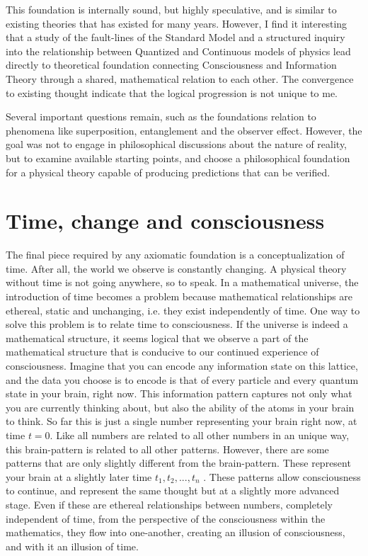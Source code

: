 \documentclass[notitlepage]{report}
\begin{document}
This foundation is internally sound, but highly speculative, and is similar to existing theories that has existed for many years. However, I find it interesting that a study of the fault-lines of the Standard Model and a structured inquiry into the relationship between Quantized and Continuous models of physics lead directly to theoretical foundation connecting Consciousness and Information Theory through a shared, mathematical relation to each other. The convergence to existing thought indicate that the logical progression is not unique to me. 

Several important questions remain, such as the foundations relation to phenomena like superposition, entanglement and the observer effect.
However, the goal was not to engage in philosophical discussions about the nature of reality, but to examine available starting points, and choose a philosophical foundation for a physical theory capable of producing predictions that can be verified. 


\section*{Time, change and consciousness}
The final piece required by any axiomatic foundation is a conceptualization of time. After all, the world we observe is constantly changing. A physical theory without time is not going anywhere, so to speak. In a mathematical universe, the introduction of time becomes a problem because mathematical relationships are ethereal, static and unchanging, i.e. they exist independently of time. 
One way to solve this problem is to relate time to consciousness. If the universe is indeed a mathematical structure, it seems logical that we observe a part of the mathematical structure that is conducive to our continued experience of consciousness. Imagine that you can encode any information state on this lattice, and the data you choose is to encode is that of every particle and every quantum state in your brain, right now. This information pattern captures not only what you are currently thinking about, but also the ability of the atoms in your brain to think.  So far this is just a single number representing your brain right now, at  time $ t =0$. 
Like all numbers are related to all other numbers in an unique way, this brain-pattern is related to all other patterns. However, there are some patterns that are only slightly different from the brain-pattern. These represent your brain at a slightly later time $ t_1, t_2, ...,  t_n $ . These patterns allow consciousness to continue, and represent the same thought but at a slightly more advanced stage.
Even if these are ethereal relationships between numbers, completely independent of time, from the perspective of the consciousness within the mathematics, they flow into one-another, creating an illusion of consciousness, and with it an illusion of time.
\end{document}
